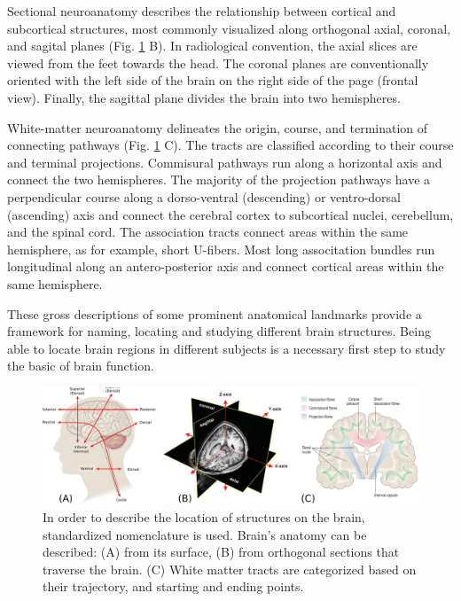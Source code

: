 Sectional neuroanatomy describes the relationship between cortical and
subcortical structures, most commonly visualized along orthogonal axial,
coronal, and sagital planes (Fig. \ref{fig:anatomy_terminology} B). In radiological
convention, the axial slices are viewed from the feet towards the head.
The coronal planes are conventionally oriented with the left side of the brain
on the right side of the page (frontal view). Finally, the sagittal plane 
divides the brain into two hemispheres.

White-matter neuroanatomy delineates the origin, course, and termination of
connecting pathways (Fig. \ref{fig:anatomy_terminology} C). The tracts are classified
according to their course and terminal projections. Commisural pathways run
along a horizontal axis and connect the two hemispheres. The majority of the
projection pathways have a perpendicular course along a dorso-ventral
(descending) or ventro-dorsal (ascending) axis and connect the cerebral
cortex to subcortical nuclei, cerebellum, and the spinal cord. The association
tracts connect areas within the same hemisphere, as for example, short U-fibers.
Most long associtation bundles
run longitudinal along an antero-posterior axis and connect cortical 
areas within the same hemisphere.

These gross descriptions of some prominent anatomical landmarks provide a
framework for naming, locating and studying different brain structures. Being
able to locate brain regions in different subjects is a necessary first step
to study the basic of brain function.

\begin{figure}[t]
    \includegraphics[width=\textwidth]{2.neuroanatomy/img/terminology.png}
    \caption{In order to describe the location of structures on the brain, standardized
             nomenclature is used. Brain's anatomy can be described: (A) from its surface,
             (B) from orthogonal sections that traverse the brain. (C) White matter tracts
             are categorized based on their trajectory, and starting and ending points.}
    \label{fig:anatomy_terminology}
\end{figure}

